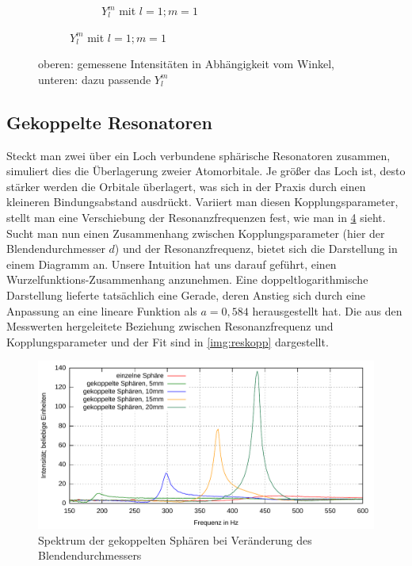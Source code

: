 \documentclass[numbers=noenddot,12pt,a4paper]{scrartcl}
\begin{document}
\begin{figure}[H]
\begin{subfigure}[h]{0.3\textwidth}
\begin{subfigure}[b]{\textwidth}
			\caption{$Y_l^m$ mit $l=1;m=1$} \label{img:l1m1y}
		\end{subfigure}
	\end{subfigure}
	\caption{oberen: gemessene Intensitäten in Abhängigkeit vom Winkel, unteren: dazu passende $Y_l^m$}
\end{figure}
\subsection{Gekoppelte Resonatoren}
Steckt man zwei über ein Loch verbundene sphärische Resonatoren zusammen, simuliert dies die Überlagerung zweier Atomorbitale. Je größer das Loch ist, desto stärker werden die Orbitale überlagert, was sich in der Praxis durch einen kleineren Bindungsabstand ausdrückt. Variiert man diesen Kopplungsparameter, stellt man eine Verschiebung der Resonanzfrequenzen fest, wie man in \ref{img:doppelspek} sieht. Sucht man nun einen Zusammenhang zwischen Kopplungsparameter (hier der Blendendurchmesser $d$) und der Resonanzfrequenz, bietet sich die Darstellung in einem Diagramm an. Unsere Intuition hat uns darauf geführt, einen Wurzelfunktions-Zusammenhang anzunehmen. Eine doppeltlogarithmische Darstellung lieferte tatsächlich eine Gerade, deren Anstieg sich durch eine Anpassung an eine lineare Funktion als $a=0,584$ herausgestellt hat. Die aus den Messwerten hergeleitete Beziehung zwischen Resonanzfrequenz und Kopplungsparameter und der Fit sind in \ref{img:reskopp} dargestellt.
\begin{figure}[H]
	\centering\includegraphics[width=\textwidth]{messwerte/doppelsphrenspektrum.pdf}
	\caption{Spektrum der gekoppelten Sphären bei Veränderung des Blendendurchmessers} \label{img:doppelspek}
\end{figure}
\end{document}
